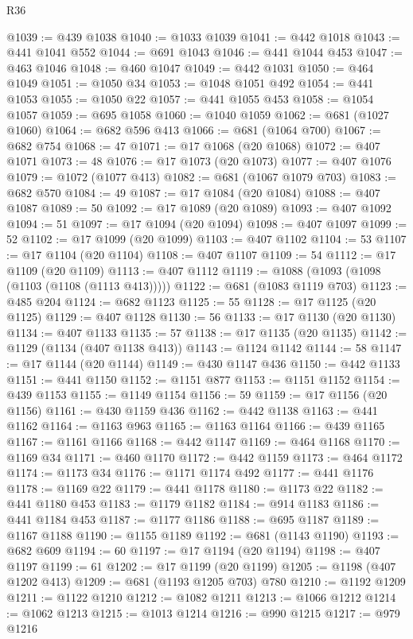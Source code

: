 \begin{lexlean}{R36}
\begin{coremodule}
@1039 := @439 @1038
@1040 := @1033 @1039
@1041 := @442 @1018
@1043 := @441 @1041 @552
@1044 := @691 @1043
@1046 := @441 @1044 @453
@1047 := @463 @1046
@1048 := @460 @1047
@1049 := @442 @1031
@1050 := @464 @1049
@1051 := @1050 @34
@1053 := @1048 @1051 @492
@1054 := @441 @1053
@1055 := @1050 @22
@1057 := @441 @1055 @453
@1058 := @1054 @1057
@1059 := @695 @1058
@1060 := @1040 @1059
@1062 := @681 (@1027 @1060)
@1064 := @682 @596 @413
@1066 := @681 (@1064 @700)
@1067 := @682 @754
@1068 := 47
@1071 := @17 @1068 (@20 @1068)
@1072 := @407 @1071
@1073 := 48
@1076 := @17 @1073 (@20 @1073)
@1077 := @407 @1076
@1079 := @1072 (@1077 @413)
@1082 := @681 (@1067 @1079 @703)
@1083 := @682 @570
@1084 := 49
@1087 := @17 @1084 (@20 @1084)
@1088 := @407 @1087
@1089 := 50
@1092 := @17 @1089 (@20 @1089)
@1093 := @407 @1092
@1094 := 51
@1097 := @17 @1094 (@20 @1094)
@1098 := @407 @1097
@1099 := 52
@1102 := @17 @1099 (@20 @1099)
@1103 := @407 @1102
@1104 := 53
@1107 := @17 @1104 (@20 @1104)
@1108 := @407 @1107
@1109 := 54
@1112 := @17 @1109 (@20 @1109)
@1113 := @407 @1112
@1119 := @1088 (@1093 (@1098 (@1103 (@1108 (@1113 @413)))))
@1122 := @681 (@1083 @1119 @703)
@1123 := @485 @204
@1124 := @682 @1123
@1125 := 55
@1128 := @17 @1125 (@20 @1125)
@1129 := @407 @1128
@1130 := 56
@1133 := @17 @1130 (@20 @1130)
@1134 := @407 @1133
@1135 := 57
@1138 := @17 @1135 (@20 @1135)
@1142 := @1129 (@1134 (@407 @1138 @413))
@1143 := @1124 @1142
@1144 := 58
@1147 := @17 @1144 (@20 @1144)
@1149 := @430 @1147 @436
@1150 := @442 @1133
@1151 := @441 @1150
@1152 := @1151 @877
@1153 := @1151 @1152
@1154 := @439 @1153
@1155 := @1149 @1154
@1156 := 59
@1159 := @17 @1156 (@20 @1156)
@1161 := @430 @1159 @436
@1162 := @442 @1138
@1163 := @441 @1162
@1164 := @1163 @963
@1165 := @1163 @1164
@1166 := @439 @1165
@1167 := @1161 @1166
@1168 := @442 @1147
@1169 := @464 @1168
@1170 := @1169 @34
@1171 := @460 @1170
@1172 := @442 @1159
@1173 := @464 @1172
@1174 := @1173 @34
@1176 := @1171 @1174 @492
@1177 := @441 @1176
@1178 := @1169 @22
@1179 := @441 @1178
@1180 := @1173 @22
@1182 := @441 @1180 @453
@1183 := @1179 @1182
@1184 := @914 @1183
@1186 := @441 @1184 @453
@1187 := @1177 @1186
@1188 := @695 @1187
@1189 := @1167 @1188
@1190 := @1155 @1189
@1192 := @681 (@1143 @1190)
@1193 := @682 @609
@1194 := 60
@1197 := @17 @1194 (@20 @1194)
@1198 := @407 @1197
@1199 := 61
@1202 := @17 @1199 (@20 @1199)
@1205 := @1198 (@407 @1202 @413)
@1209 := @681 (@1193 @1205 @703) @780
@1210 := @1192 @1209
@1211 := @1122 @1210
@1212 := @1082 @1211
@1213 := @1066 @1212
@1214 := @1062 @1213
@1215 := @1013 @1214
@1216 := @990 @1215
@1217 := @979 @1216

\end{coremodule}
\end{lexlean}
